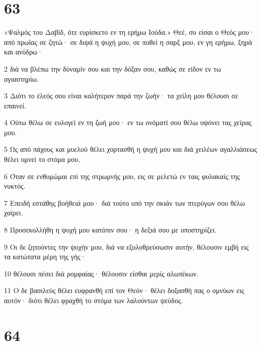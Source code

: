 \chapter{63}

\par «Ψαλμός του Δαβίδ, ότε ευρίσκετο εν τη ερήμω Ιούδα.» Θεέ, συ είσαι ο Θεός μου· από πρωΐας σε ζητώ· σε διψά η ψυχή μου, σε ποθεί η σαρξ μου, εν γη ερήμω, ξηρά και ανύδρω·
\par 2 διά να βλέπω την δύναμίν σου και την δόξαν σου, καθώς σε είδον εν τω αγιαστηρίω.
\par 3 Διότι το έλεός σου είναι καλήτερον παρά την ζωήν· τα χείλη μου θέλουσι σε επαινεί.
\par 4 Ούτω θέλω σε ευλογεί εν τη ζωή μου· εν τω ονόματί σου θέλω υψόνει τας χείρας μου.
\par 5 Ως από πάχους και μυελού θέλει χορτασθή η ψυχή μου και διά χειλέων αγαλλιάσεως θέλει υμνεί το στόμα μου,
\par 6 Όταν σε ενθυμώμαι επί της στρωμνής μου, εις σε μελετώ εν ταις φυλακαίς της νυκτός.
\par 7 Επειδή εστάθης βοήθειά μου· διά τούτο υπό την σκιάν των πτερύγων σου θέλω χαίρει.
\par 8 Προσεκολλήθη η ψυχή μου κατόπιν σου· η δεξιά σου με υποστηρίζει.
\par 9 Οι δε ζητούντες την ψυχήν μου, διά να εξολοθρεύσωσιν αυτήν, θέλουσιν εμβή εις τα κατώτατα μέρη της γής·
\par 10 θέλουσι πέσει διά ρομφαίας· θέλουσιν είσθαι μερίς αλωπέκων.
\par 11 Ο δε βασιλεύς θέλει ευφρανθή επί τον Θεόν· θέλει δοξασθή πας ο ομνύων εις αυτόν· διότι θέλει φραχθή το στόμα των λαλούντων ψεύδος.

\chapter{64}

